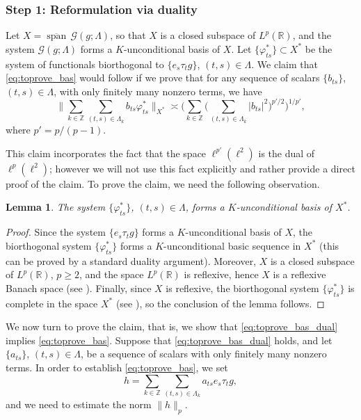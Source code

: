 \documentclass[reqno,a4paper,12pt]{amsart}
\numberwithin{equation}{section}
\numberwithin{figure}{section}
\newcommand\R{\mathbb{R}}
\newcommand\Z{\mathbb{Z}}
\newcommand\G{\mathcal{G}}
\newcommand\1{\mathds{1}}
\newcommand{\pphi}{\varphi}
\newcommand{\ts}{\tau}
\renewcommand\ge{\geqslant}
\newcommand{\cspan}{\overline{\operatorname{span}}}
\theoremstyle{plain}
\newtheorem{lem}[thm]{Lemma}
\theoremstyle{definition}
\begin{document}
\subsubsection{Step 1: Reformulation via duality}
Let $X= \cspan\,  \G(g;\Lambda)$, so that $X$ is a closed subspace of
$L^p(\R)$, and the system
$\G(g; \Lambda)$ forms a $K$-unconditional basis of $X$.
Let  $\{\pphi_{ts}^*\} \subset X^*$ be the 
system of functionals biorthogonal to $\{e_s\tau_t g\}$, $(t,s)\in\Lambda$. 
We claim that  \eqref{eq:toprove_bas} would follow if we prove that for any sequence of scalars 
$\{b_{ts}\}$, $(t,s)\in \Lambda$, with only finitely many nonzero terms, we have
\begin{equation}
\label{eq:toprove_bas_dual}
\Big\| \sum_{k\in\Z} \sum_{(t,s)\in\Lambda_k} b_{ts} \pphi_{ts}^* \Big\|_{X^*} \asymp \Big(\sum_{k\in\Z}\Big( \sum_{(t,s)\in\Lambda_k}|b_{ts}|^2 \Big)^{p'/2} \Big)^{1/p'},
\end{equation}
where $p' = p/(p-1)$. 

This claim incorporates the fact that the space $\ell^{p'}(\ell^2)$ is 
the dual of $\ell^p(\ell^2)$; however we will not use this
fact explicitly and rather provide a direct proof of the claim.
To prove the claim, we need the following observation.


\begin{lem}
\label{lem:dual.k}
The system $\{\pphi_{ts}^*\}$,  $(t,s)\in \Lambda$,  forms a
$K$-unconditional basis of $X^*$.
\end{lem}

\begin{proof}
Since the system $\{e_s\tau_t g\}$
  forms a $K$-unconditional basis of $X$, 
the biorthogonal system $\{\pphi_{ts}^*\}$ forms a
$K$-unconditional basic sequence in $X^*$
(this can be proved by a standard duality argument). Moreover, 
 $X$ is a closed subspace of $L^p(\R)$, $p \ge 2$, and the space $L^p(\R)$ is reflexive, hence $X$ is a reflexive Banach space (see \cite[Theorem II.A.14]{Woj91}).
Finally, since $X$ is reflexive, the biorthogonal system
$\{\pphi_{ts}^*\}$ is complete in the space $X^*$ 
(see \cite[Proposition 3.2.6]{AK16}),
so the conclusion of the lemma follows.
\end{proof}


We now turn to prove the claim, that is, we show
that \eqref{eq:toprove_bas_dual} implies \eqref{eq:toprove_bas}.
Suppose that \eqref{eq:toprove_bas_dual} holds,
and let $\{a_{ts}\}$, $(t,s)\in \Lambda$, be a sequence of
scalars with only finitely many nonzero terms. 
In order to establish \eqref{eq:toprove_bas}, we set
\begin{equation}
h =   \sum_{k \in \Z} \sum_{(t,s)\in\Lambda_k}   a_{ts} e_s \ts_t g,
\end{equation}
and we need to estimate the norm $\|h\|_p$.
\end{document}
